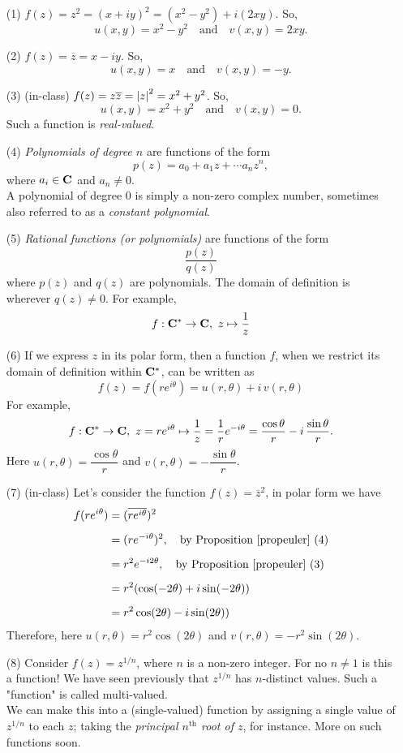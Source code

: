 \medskip

\begin{example}\hfill
\begin{itemize}
\item[(1)] $f(z) = z^2 = (x+iy)^2 = (x^2 - y^2) + i(2xy)$. So, \[u(x,y) = x^2 - y^2 \quad \text{and} \quad v(x,y) = 2xy.\]
\item[(2)] $f(z) = \overline{z} = x-iy$. So, \[u(x,y) = x \quad \text{and} \quad v(x,y) = -y.\]
\item[(3)] (in-class) $f(z) = z\overline{z} = \left\lvert z\right\rvert^2 = x^2+y^2$. So, \[u(x,y) = x^2 + y^2 \quad \text{and} \quad v(x,y) = 0.\]
Such a function is \emph{real-valued}.
\item[(4)] \emph{Polynomials of degree $n$} are functions of the form \[p(z) = a_0 + a_1z + \cdots a_nz^n,\] where $a_i \in \mathbf C$ and $a_n \neq 0$.\\[1em]
A polynomial of degree $0$ is simply a non-zero complex number, sometimes also referred to as a \emph{constant polynomial}.
\item[(5)] \emph{Rational functions (or polynomials)} are functions of the form
\[\dfrac{p(z)}{q(z)}\]
where $p(z)$ and $q(z)$ are polynomials. The domain of definition is wherever $q(z) \neq 0$. For example,
\[f:\mathbf C^* \to \mathbf C,\ z \mapsto \frac{1}{z}\]
\item[(6)] If we express $z$ in its polar form, then a function $f$, when we restrict its domain of definition within $\mathbf C^*$, can be written as
\[f(z) = f(re^{i\theta}) = u(r,\theta) + i\,v(r,\theta)\]
For example,
\[f:\mathbf C^* \to \mathbf C,\ z = re^{i\theta} \mapsto \frac{1}{z} = \frac{1}{r}e^{-i\theta} = \frac{\cos\theta}{r} - i\,\frac{\sin\theta}{r}.\]
Here $u(r,\theta) = \dfrac{\cos\theta}{r}$ and $v(r,\theta) = -\dfrac{\sin\theta}{r}$.
\item[(7)] (in-class) Let's consider the function $f(z) = \overline{z}^2$, in polar form we have
\begin{align*}
f(re^{i\theta}) &= (\overline{re^{i\theta}})^2\\[0.5em]
&= (re^{-i\theta})^2,\quad \text{by Proposition \ref{propeuler} (4)}\\[0.5em]
&= r^2e^{-i2\theta},\quad \text{by Proposition \ref{propeuler} (3)}\\[0.5em]
&= r^2(\cos(-2\theta) + i\sin(-2\theta))\\[0.5em]
&= r^2\cos(2\theta) - i\sin(2\theta))
\end{align*}
Therefore, here $u(r,\theta) = r^2\cos(2\theta)$ and $v(r,\theta) = -r^2\sin(2\theta)$.
\item[(8)] Consider $f(z) = z^{1/n}$, where $n$ is a non-zero integer. For no $n \neq 1$ is this a function! We have seen previously that $z^{1/n}$ has $n$-distinct values. Such a "function" is called multi-valued.\\[1em]
We can make this into a (single-valued) function by assigning a single value of $z^{1/n}$ to each $z$; taking the \emph{principal $n^{\text{th}}$ root of $z$}, for instance. More on such functions soon. 
\end{itemize}
\end{example}

